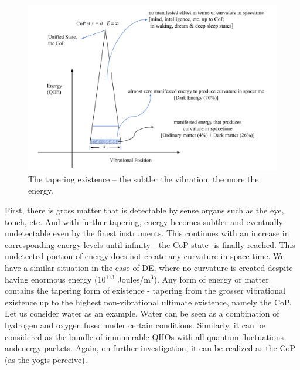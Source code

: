 \documentclass[twoside, 13pt]{article}
\begin{document}
{%

\begin{figure}[h]
\centering
\includegraphics[scale=.43]{images/003.png}
\caption{{\fontsize{10}{12}\selectfont The tapering existence – the subtler the vibration, the more the energy.}}\label{art1-fig2}
\end{figure}

{\fontsize{12}{14}\selectfont First, there is gross matter that is detectable by sense organs such as the eye, touch, etc. And with further tapering, energy becomes subtler and eventually undetectable even by the finest instruments. This continues with an increase in corresponding energy levels until infinity - the CoP state -is finally reached. This undetected portion of energy does not create any curvature in space-time. We have a similar situation in the case of DE, where no curvature is created despite having enormous energy (10$^{113}$ Joules/m$^{3}$). Any form of energy or matter contains the tapering form of existence - tapering from the grosser vibrational existence up to the highest non-vibrational ultimate existence, namely the CoP. Let us consider water as an example. Water can be seen as a combination of hydrogen and oxygen fused under certain conditions. Similarly, it can be considered as the bundle of innumerable QHOs with all quantum fluctuations and\break energy packets. Again, on further investigation, it can be realized as the CoP (as the yogis perceive).

}}
\end{document}
